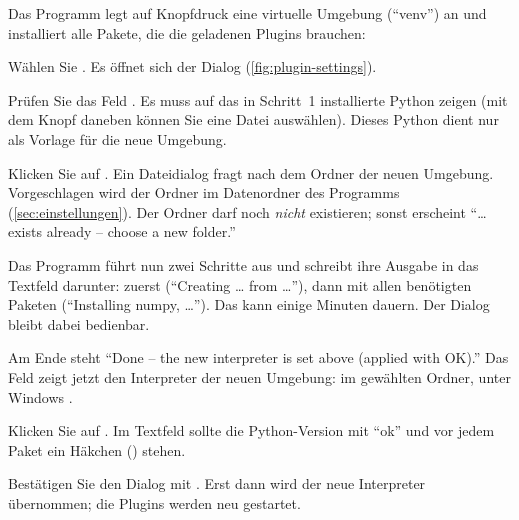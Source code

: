 Das Programm legt auf Knopfdruck eine virtuelle Umgebung (\enquote{venv}) an und installiert
alle Pakete, die die geladenen Plugins brauchen:

\begin{schritte}
  \item Wählen Sie . Es öffnet sich der Dialog  (\autoref{fig:plugin-settings}).
  \item Prüfen Sie das Feld . Es muss auf das in Schritt~1
    installierte Python zeigen (mit dem Knopf  daneben können Sie eine Datei
    auswählen). Dieses Python dient nur als Vorlage für die neue Umgebung.
  \item Klicken Sie auf . Ein Dateidialog  fragt nach dem Ordner der neuen Umgebung. Vorgeschlagen wird der
    Ordner  im Datenordner des Programms (\autoref{sec:einstellungen}).
    Der Ordner darf noch \emph{nicht} existieren; sonst erscheint \enquote{\dots{} exists
    already -- choose a new folder.}
  \item Das Programm führt nun zwei Schritte aus und schreibt ihre Ausgabe in das Textfeld
    darunter: zuerst  (\enquote{Creating \dots{} from \dots}),
    dann  mit allen benötigten Paketen (\enquote{Installing numpy, \dots}).
    Das kann einige Minuten dauern. Der Dialog bleibt dabei bedienbar.
  \item Am Ende steht \enquote{Done -- the new interpreter is set above (applied with OK).}
    Das Feld  zeigt jetzt den Interpreter der neuen
    Umgebung:  im gewählten Ordner, unter Windows
    .
  \item Klicken Sie auf . Im Textfeld sollte die Python-Version mit
    \enquote{ok} und vor jedem Paket ein Häkchen (\checkmark) stehen.
  \item Bestätigen Sie den Dialog mit . Erst dann wird der neue Interpreter
    übernommen; die Plugins werden neu gestartet.
\end{schritte}


